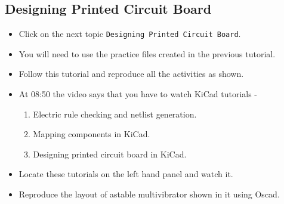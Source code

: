  
\subsection{Designing Printed Circuit Board}
\begin{itemize}
\item Click on the next topic {\tt Designing Printed Circuit Board}.

\item You will need to use the practice files created in the previous tutorial.
\item Follow this tutorial and reproduce all the activities as shown.
\item At 08:50 the video says that you have to watch KiCad tutorials - 
\begin{enumerate}
\item Electric rule checking and netlist generation.
\item Mapping components in KiCad.
\item Designing printed circuit board in KiCad.
\end{enumerate}
\item Locate these tutorials on the left hand panel and watch it.
\item Reproduce the layout of astable multivibrator shown in it using Oscad.
\end{itemize}

\newpage

